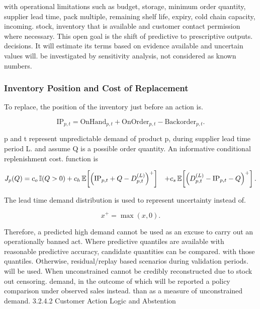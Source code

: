 \documentclass[a4paper,11pt,oneside]{book}
\theoremstyle{plain}
\theoremstyle{definition}
\theoremstyle{remark}
\let\\\space
\begin{document}
with operational limitations such as budget, storage, minimum order quantity, supplier lead time, pack multiple, remaining shelf life, expiry, cold chain capacity, incoming. stock, inventory that is available and customer contact permission where necessary. This open goal is the shift of predictive to prescriptive outputs. decisions. It will estimate its terms based on evidence available and uncertain values will. be investigated by sensitivity analysis, not considered as known numbers.

\subsubsection{Inventory Position and Cost of Replacement}

To replace, the position of the inventory just before an action is.

\begin{equation}
\mathrm{IP}_{p,t}=\mathrm{OnHand}_{p,t}+\mathrm{OnOrder}_{p,t}-\mathrm{Backorder}_{p,t}.
\label{eq:inventoryposition}
\end{equation}

p and t represent unpredictable demand of product p, during supplier lead time period L. and assume Q is a possible order quantity. An informative conditional replenishment cost. function is

\begin{equation}
\begin{aligned}
J_p(Q)={}&c_o\,\mathbb{I}(Q>0)
+c_h\,\mathbb{E}\!\left[\left(\mathrm{IP}_{p,t}+Q-D^{(L)}_{p,t}\right)^+\right]\\
&+c_s\,\mathbb{E}\!\left[\left(D^{(L)}_{p,t}-\mathrm{IP}_{p,t}-Q\right)^+\right].
\end{aligned}
\label{eq:replenishmentcost}
\end{equation}

The lead time demand distribution is used to represent uncertainty instead of.

\begin{equation}
x^+=\max(x,0).
\label{eq:positive_part}
\end{equation}

Therefore, a predicted high demand cannot be used as an excuse to carry out an operationally banned act. Where predictive quantiles are available with reasonable predictive accuracy, candidate quantities can be compared. with those quantiles. Otherwise, residual/replay based scenarios during validation periods. will be used. When unconstrained cannot be credibly reconstructed due to stock out censoring. demand, in the outcome of which will be reported a policy comparison under observed sales instead. than as a measure of unconstrained demand. 3.2.4.2 Customer Action Logic and Abstention
\end{document}
